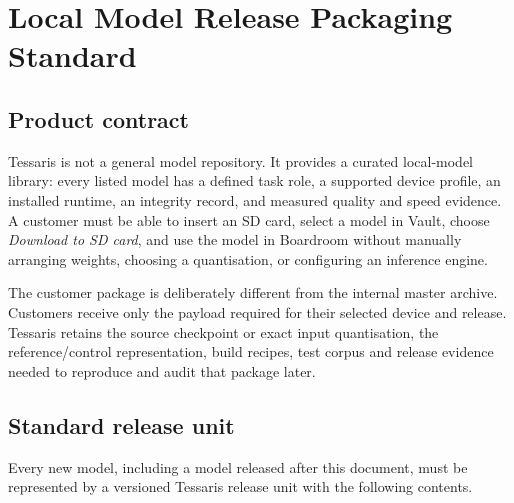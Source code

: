 \section{Local Model Release Packaging Standard}
\label{sec:local-model-release-standard}

\subsection{Product contract}

Tessaris is not a general model repository.  It provides a curated local-model
library: every listed model has a defined task role, a supported device profile,
an installed runtime, an integrity record, and measured quality and speed
evidence.  A customer must be able to insert an SD card, select a model in
Vault, choose \emph{Download to SD card}, and use the model in Boardroom without
manually arranging weights, choosing a quantisation, or configuring an
inference engine.

The customer package is deliberately different from the internal master
archive.  Customers receive only the payload required for their selected device
and release.  Tessaris retains the source checkpoint or exact input quantisation,
the reference/control representation, build recipes, test corpus and release
evidence needed to reproduce and audit that package later.

\subsection{Standard release unit}

Every new model, including a model released after this document, must be
represented by a versioned Tessaris release unit with the following contents.

